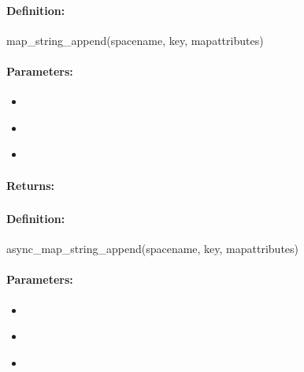 \paragraph{Definition:}
\begin{rubycode}
map_string_append(spacename, key, mapattributes)
\end{rubycode}

\paragraph{Parameters:}
\begin{itemize}[noitemsep]
\item {}\\

\item {}\\

\item {}\\

\end{itemize}

\paragraph{Returns:}


\pagebreak
\subsubsection{}
\label{api:ruby:async_map_string_append}


\paragraph{Definition:}
\begin{rubycode}
async_map_string_append(spacename, key, mapattributes)
\end{rubycode}

\paragraph{Parameters:}
\begin{itemize}[noitemsep]
\item {}\\

\item {}\\

\item {}\\

\end{itemize}

